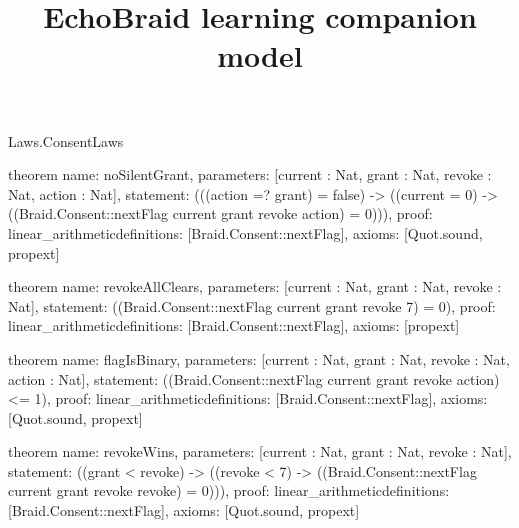 \begin{lexlean}{Laws.ConsentLaws}
\title{EchoBraid learning companion model}
\begin{semanticmodule}
theorem{
  name: noSilentGrant,
  parameters: [current : Nat, grant : Nat, revoke : Nat, action : Nat],
  statement: (((action =? grant) = false) -> ((current = 0) -> ((Braid.Consent::nextFlag current grant revoke action) = 0))),
  proof: linear_arithmetic{definitions: [Braid.Consent::nextFlag]},
  axioms: [Quot.sound, propext]
}

theorem{
  name: revokeAllClears,
  parameters: [current : Nat, grant : Nat, revoke : Nat],
  statement: ((Braid.Consent::nextFlag current grant revoke 7) = 0),
  proof: linear_arithmetic{definitions: [Braid.Consent::nextFlag]},
  axioms: [propext]
}

theorem{
  name: flagIsBinary,
  parameters: [current : Nat, grant : Nat, revoke : Nat, action : Nat],
  statement: ((Braid.Consent::nextFlag current grant revoke action) <= 1),
  proof: linear_arithmetic{definitions: [Braid.Consent::nextFlag]},
  axioms: [Quot.sound, propext]
}

theorem{
  name: revokeWins,
  parameters: [current : Nat, grant : Nat, revoke : Nat],
  statement: ((grant < revoke) -> ((revoke < 7) -> ((Braid.Consent::nextFlag current grant revoke revoke) = 0))),
  proof: linear_arithmetic{definitions: [Braid.Consent::nextFlag]},
  axioms: [Quot.sound, propext]
}
\end{semanticmodule}
\end{lexlean}
